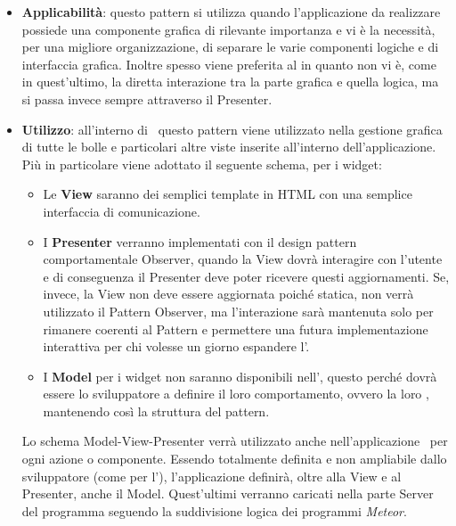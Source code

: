 \begin{itemize}
	\item \textbf{Applicabilità}: questo pattern si utilizza quando l'applicazione da realizzare possiede una componente grafica di rilevante importanza e vi è la necessità, per una migliore organizzazione, di separare le varie componenti logiche e di interfaccia grafica. Inoltre spesso viene preferita al  in quanto non vi è, come in quest'ultimo, la diretta interazione tra la parte grafica e quella logica, ma si passa invece sempre attraverso il Presenter.
	\item \textbf{Utilizzo}: all'interno di \progettoShort\ questo pattern viene utilizzato nella gestione grafica di tutte le bolle e particolari altre viste inserite all'interno dell'applicazione. Più in particolare viene adottato il seguente schema, per i widget:
\begin{itemize}
\item Le \textbf{View} saranno dei semplici template in HTML con una semplice interfaccia di comunicazione.
\item I \textbf{Presenter} verranno implementati con il design pattern comportamentale Observer, quando la View dovrà interagire con l'utente e di conseguenza il Presenter deve poter ricevere questi aggiornamenti. Se, invece, la View non deve essere aggiornata poiché statica, non verrà utilizzato il Pattern Observer, ma l'interazione sarà mantenuta solo per rimanere coerenti al Pattern e permettere una futura implementazione interattiva per chi volesse un giorno espandere l'.
\item I \textbf{Model} per i widget non saranno disponibili nell', questo perché dovrà essere lo sviluppatore a definire il loro  comportamento, ovvero la loro , mantenendo così la struttura del pattern.
\end{itemize}
Lo schema Model-View-Presenter verrà utilizzato anche nell'applicazione \app\ per ogni azione o componente.
Essendo totalmente definita e non ampliabile dallo sviluppatore (come per l'), l'applicazione definirà, oltre alla View e al Presenter, anche il Model. Quest'ultimi verranno caricati nella parte Server del programma seguendo la suddivisione logica dei programmi \textit{Meteor}.
\end{itemize}

